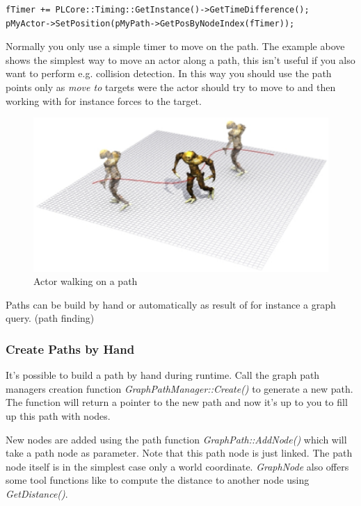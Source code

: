 \begin{lstlisting}[caption=Moving along path]
fTimer += PLCore::Timing::GetInstance()->GetTimeDifference();
pMyActor->SetPosition(pMyPath->GetPosByNodeIndex(fTimer));
\end{lstlisting}

Normally you only use a simple timer to move on the path. The example above shows the simplest way to move an actor along a path, this isn't useful if you also want to perform e.g. collision detection. In this way you should use the path points only as \emph{move to} targets were the actor should try to move to and then working with for instance forces to the target.

\begin{figure}
  \begin{center}
    \includegraphics{pics/Paths.eps}
  \end{center}
  \caption{Actor walking on a path}
  \label{fig:Actor walking on a path}
\end{figure}

Paths can be build by hand or automatically as result of for instance a graph query. (path finding)



\subsubsection{Create Paths by Hand}
It's possible to build a path by hand during runtime. Call the graph path managers creation function \emph{GraphPathManager::Create()} to generate a new path. The function will return a pointer to the new path and now it's up to you to fill up this path with nodes.

New nodes are added using the path function \emph{GraphPath::AddNode()} which will take a path node as parameter. Note that this path node is just linked. The path node itself is in the simplest case only a world coordinate. \emph{GraphNode} also offers some tool functions like to compute the distance to another node using \emph{GetDistance()}.

